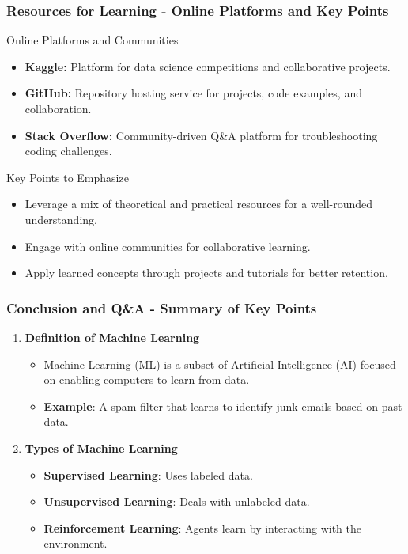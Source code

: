 \documentclass[aspectratio=169]{beamer}
\begin{document}
\begin{frame}[fragile]
    \frametitle{Resources for Learning - Online Platforms and Key Points}
    \begin{block}{Online Platforms and Communities}
        \begin{itemize}
            \item \textbf{Kaggle:} Platform for data science competitions and collaborative projects.
            \item \textbf{GitHub:} Repository hosting service for projects, code examples, and collaboration.
            \item \textbf{Stack Overflow:} Community-driven Q\&A platform for troubleshooting coding challenges.
        \end{itemize}
    \end{block}
    
    \begin{block}{Key Points to Emphasize}
        \begin{itemize}
            \item Leverage a mix of theoretical and practical resources for a well-rounded understanding.
            \item Engage with online communities for collaborative learning.
            \item Apply learned concepts through projects and tutorials for better retention.
        \end{itemize}
    \end{block}
\end{frame}

\begin{frame}[fragile]
    \frametitle{Conclusion and Q\&A - Summary of Key Points}
    \begin{enumerate}
        \item \textbf{Definition of Machine Learning}
            \begin{itemize}
                \item Machine Learning (ML) is a subset of Artificial Intelligence (AI) focused on enabling computers to learn from data.
                \item \textbf{Example}: A spam filter that learns to identify junk emails based on past data.
            \end{itemize}

        \item \textbf{Types of Machine Learning}
            \begin{itemize}
                \item \textbf{Supervised Learning}: Uses labeled data.
                \item \textbf{Unsupervised Learning}: Deals with unlabeled data.
                \item \textbf{Reinforcement Learning}: Agents learn by interacting with the environment.
            \end{itemize}
    \end{enumerate}
\end{frame}
\end{document}

